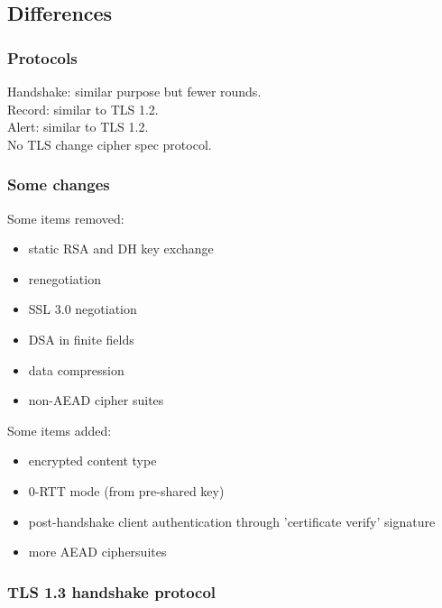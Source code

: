 \documentclass{article}
\begin{document}
\subsection{Differences}

\subsubsection{Protocols}

Handshake: similar purpose but fewer rounds.\\
Record: similar to TLS 1.2.\\
Alert: similar to TLS 1.2.\\
No TLS change cipher spec protocol.

\subsubsection{Some changes}

\noindent\begin{minipage}{0.48\textwidth}%
Some items removed:
\begin{itemize}
    \item static RSA and DH key exchange
    \item renegotiation
    \item SSL 3.0 negotiation
    \item DSA in finite fields
    \item data compression
    \item non-AEAD cipher suites
\end{itemize}
\end{minipage}%
\hfill%
\begin{minipage}{0.48\textwidth}
Some items added:
\begin{itemize}
    \item encrypted content type
    \item 0-RTT mode (from pre-shared key)
    \item post-handshake client authentication through 'certificate verify' signature
    \item more AEAD ciphersuites
\end{itemize}
\end{minipage}

\subsubsection{TLS 1.3 handshake protocol}
\end{document}
